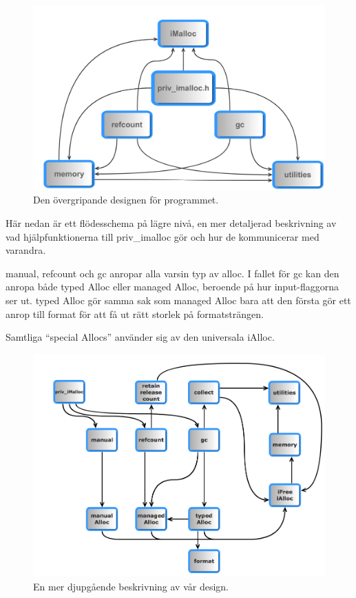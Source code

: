 \documentclass{article}
\begin{document}
\begin{figure}[H]
  \includegraphics[width=\columnwidth]{../bilder/design_overview.png}
  \caption{Den övergripande designen för programmet.}
  \label{fig:stable}
\end{figure}



Här nedan är ett flödesschema på lägre nivå, en mer detaljerad beskrivning av vad hjälpfunktionerna till priv\_imalloc gör och hur de kommunicerar med varandra.

manual, refcount och gc anropar alla varsin typ av alloc. I fallet för gc kan den anropa både typed Alloc eller managed Alloc, beroende på hur input-flaggorna ser ut. typed Alloc gör samma sak som managed Alloc bara att den första gör ett anrop till format för att få ut rätt storlek på formatsträngen.

Samtliga “special Allocs” använder sig av den universala iAlloc.


\begin{figure}[H]
  \includegraphics[width=\columnwidth]{../bilder/design_depth.png}
  \caption{En mer djupgående beskrivning av vår design.}
  \label{fig:stable}
\end{figure}
\end{document}
